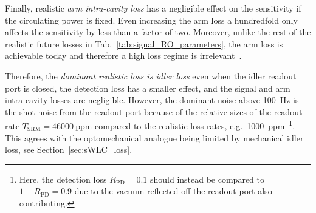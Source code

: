 Finally, realistic \emph{arm intra-cavity loss} has a negligible effect on the sensitivity if the circulating power is fixed. Even increasing the arm loss a hundredfold only affects the sensitivity by less than a factor of two. Moreover, unlike the rest of the realistic future losses in Tab.~\ref{tab:signal_RO_parameters}, the arm loss is achievable today and therefore a high loss regime is irrelevant~\cite{hardwick_2019,zhangBroadbandSignalRecycling2021}. %

Therefore, the \emph{dominant realistic loss is idler loss} even when the idler readout port is closed, the detection loss has a smaller effect, and the signal and arm intra-cavity losses are negligible. However, the dominant noise above 100~Hz is the shot noise from the readout port because of the relative sizes of the readout rate $T_\text{SRM}=46000~\text{ppm}$ compared to the realistic loss rates, e.g.\ 1000~ppm~\footnote{Here, the detection loss $R_\text{PD}=0.1$ should instead be compared to $1-R_\text{PD}=0.9$ due to the vacuum reflected off the readout port also contributing.}. This agrees with the optomechanical analogue being limited by mechanical idler loss, see Section~\ref{sec:sWLC_loss}. 

